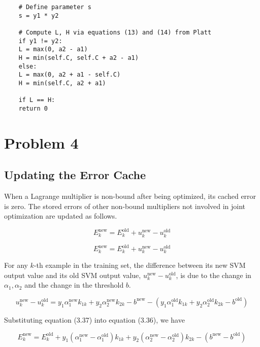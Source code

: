 \documentclass[10pt,a4paper]{article}
\newcounter{para}
\begin{document}
\begin{lstlisting}
	# Define parameter s
	s = y1 * y2
	
	# Compute L, H via equations (13) and (14) from Platt
	if y1 != y2:
	L = max(0, a2 - a1)
	H = min(self.C, self.C + a2 - a1)
	else:
	L = max(0, a2 + a1 - self.C)
	H = min(self.C, a2 + a1)
	
	if L == H:
	return 0
\end{lstlisting}

\section*{Problem 4}

\subsection{Updating the Error Cache}

When a Lagrange multiplier is non-bound after being optimized, its cached error is zero. The stored errors of other
non-bound multipliers not involved in joint optimization are updated as follows.

\begin{equation}
	E_k^{\text{new}} = E_k^{\text{old}} + u_k^{\text{new}} - u_k^{\text{old}} \tag{3.36}
\end{equation}

\begin{equation}
	E_k^{\text{new}} = E_k^{\text{old}} + u_k^{\text{new}} - u_k^{\text{old}} \tag{3.37}
\end{equation}

For any \( k \)-th example in the training set, the difference between its new SVM output value and its old SVM output
value, \( u_k^{\text{new}} - u_k^{\text{old}} \), is due to the change in \( \alpha_1, \alpha_2 \) and the change in the threshold \( b \).

\begin{equation}
	u_k^{\text{new}} - u_k^{\text{old}} = y_1 \alpha_1^{\text{new}} k_{1k} + y_2 \alpha_2^{\text{new}} k_{2k} - b^{\text{new}} 
	- \left( y_1 \alpha_1^{\text{old}} k_{1k} + y_2 \alpha_2^{\text{old}} k_{2k} - b^{\text{old}} \right) \tag{3.38}
\end{equation}

Substituting equation (3.37) into equation (3.36), we have

\begin{equation}
	E_k^{\text{new}} = E_k^{\text{old}} + y_1 \left( \alpha_1^{\text{new}} - \alpha_1^{\text{old}} \right) k_{1k} 
	+ y_2 \left( \alpha_2^{\text{new}} - \alpha_2^{\text{old}} \right) k_{2k} - (b^{\text{new}} - b^{\text{old}}) \tag{3.39}
\end{equation}
\end{document}
